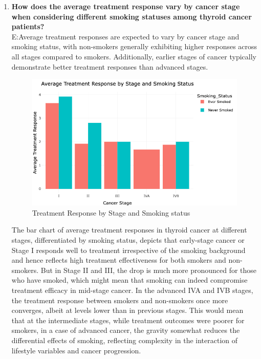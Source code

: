 \documentclass[12pt]{article}
\begin{document}
\begin{enumerate}
\newpage
    
    \item \textbf{How does the average treatment response vary by cancer stage when considering different smoking statuses among thyroid cancer patients?}\\ 
 E:Average treatment responses are expected to vary by cancer stage and smoking status, with non-smokers generally exhibiting higher responses across all stages compared to smokers. Additionally, earlier stages of cancer typically demonstrate better treatment responses than advanced stages. 

\begin{figure}[h]
        \vspace{5pt}
        \centering
        \includegraphics[width=1.1\textwidth]{average.png}  
        \caption{Treatment Response by Stage and Smoking status}
            \label{fig:example}
       \vspace{0.5cm}
    \end{figure}    
    

The bar chart of average treatment responses in thyroid cancer at different stages, differentiated by smoking status, depicts that early-stage cancer or Stage I responds well to treatment irrespective of the smoking background and hence reflects high treatment effectiveness for both smokers and non-smokers. But in Stage II and III, the drop is much more pronounced for those who have smoked, which might mean that smoking can indeed compromise treatment efficacy in mid-stage cancer. In the advanced IVA and IVB stages, the treatment response between smokers and non-smokers once more converges, albeit at levels lower than in previous stages. This would mean that at the intermediate stages, while treatment outcomes were poorer for smokers, in a case of advanced cancer, the gravity somewhat reduces the differential effects of smoking, reflecting complexity in the interaction of lifestyle variables and cancer progression.


\end{enumerate}
\end{document}
